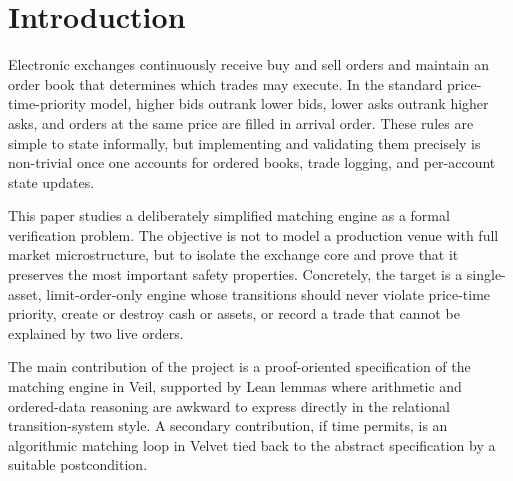 \section{Introduction}

Electronic exchanges continuously receive buy and sell orders and maintain an
order book that determines which trades may execute. In the standard
price-time-priority model, higher bids outrank lower bids, lower asks outrank
higher asks, and orders at the same price are filled in arrival order. These
rules are simple to state informally, but implementing and validating them
precisely is non-trivial once one accounts for ordered books, trade logging,
and per-account state updates.

This paper studies a deliberately simplified matching engine as a formal
verification problem. The objective is not to model a production venue with
full market microstructure, but to isolate the exchange core and prove that it
preserves the most important safety properties. Concretely, the target is a
single-asset, limit-order-only engine whose transitions should never violate
price-time priority, create or destroy cash or assets, or record a trade that
cannot be explained by two live orders.

The main contribution of the project is a proof-oriented specification of the
matching engine in Veil, supported by Lean lemmas where arithmetic and
ordered-data reasoning are awkward to express directly in the relational
transition-system style. A secondary contribution, if time permits, is an
algorithmic matching loop in Velvet tied back to the abstract specification by
a suitable postcondition.

